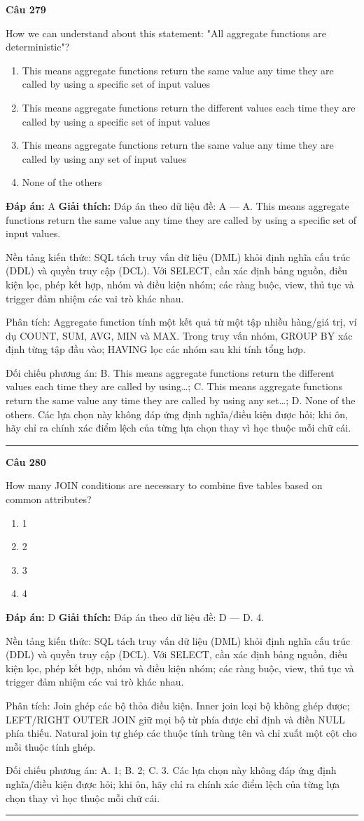 \documentclass[11pt,a4paper]{article}
\newenvironment{question}[1]{%
  \par\vspace{1em}\noindent\textbf{\large Câu #1}\par\vspace{0.4em}
}{%
  \par\vspace{1em}\hrule\vspace{0.6em}
}
\newenvironment{choices}{%
  \begin{enumerate}[label=\textbf{\Alph*.},leftmargin=2.2em,itemsep=2pt,topsep=3pt]
}{%
  \end{enumerate}
}
\newcommand{\choice}{\item}
\begin{document}
\begin{question}{279}
How we can understand about this statement:
"All aggregate functions are deterministic"?
\begin{choices}
\choice This means aggregate functions return the same value any time they are called by using a specific set of input values
\choice This means aggregate functions return the different values each time they are called by using a specific set of input values
\choice This means aggregate functions return the same value any time they are called by using any set of input values
\choice None of the others
\end{choices}
\textbf{Đáp án:} A
\textbf{Giải thích:} Đáp án theo dữ liệu đề: A — A. This means aggregate functions return the same value any time they are called by using a specific set of input values.

Nền tảng kiến thức: SQL tách truy vấn dữ liệu (DML) khỏi định nghĩa cấu trúc (DDL) và quyền truy cập (DCL). Với SELECT, cần xác định bảng nguồn, điều kiện lọc, phép kết hợp, nhóm và điều kiện nhóm; các ràng buộc, view, thủ tục và trigger đảm nhiệm các vai trò khác nhau.

Phân tích: Aggregate function tính một kết quả từ một tập nhiều hàng/giá trị, ví dụ COUNT, SUM, AVG, MIN và MAX. Trong truy vấn nhóm, GROUP BY xác định từng tập đầu vào; HAVING lọc các nhóm sau khi tính tổng hợp.

Đối chiếu phương án: B. This means aggregate functions return the different values each time they are called by using…; C. This means aggregate functions return the same value any time they are called by using any set…; D. None of the others. Các lựa chọn này không đáp ứng định nghĩa/điều kiện được hỏi; khi ôn, hãy chỉ ra chính xác điểm lệch của từng lựa chọn thay vì học thuộc mỗi chữ cái.
\end{question}

\begin{question}{280}
How many JOIN conditions are necessary to combine five tables based on common attributes?
\begin{choices}
\choice 1
\choice 2
\choice 3
\choice 4
\end{choices}
\textbf{Đáp án:} D
\textbf{Giải thích:} Đáp án theo dữ liệu đề: D — D. 4.

Nền tảng kiến thức: SQL tách truy vấn dữ liệu (DML) khỏi định nghĩa cấu trúc (DDL) và quyền truy cập (DCL). Với SELECT, cần xác định bảng nguồn, điều kiện lọc, phép kết hợp, nhóm và điều kiện nhóm; các ràng buộc, view, thủ tục và trigger đảm nhiệm các vai trò khác nhau.

Phân tích: Join ghép các bộ thỏa điều kiện. Inner join loại bộ không ghép được; LEFT/RIGHT OUTER JOIN giữ mọi bộ từ phía được chỉ định và điền NULL phía thiếu. Natural join tự ghép các thuộc tính trùng tên và chỉ xuất một cột cho mỗi thuộc tính ghép.

Đối chiếu phương án: A. 1; B. 2; C. 3. Các lựa chọn này không đáp ứng định nghĩa/điều kiện được hỏi; khi ôn, hãy chỉ ra chính xác điểm lệch của từng lựa chọn thay vì học thuộc mỗi chữ cái.
\end{question}
\end{document}
